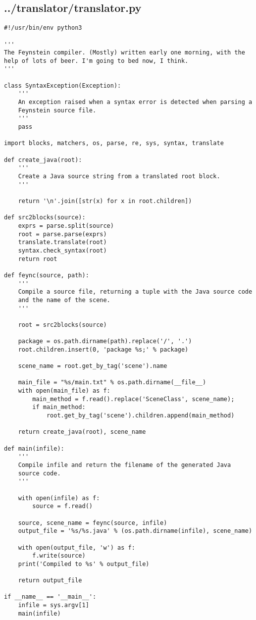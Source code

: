 \subsection*{../translator/translator.py}
\begin{lstlisting}
#!/usr/bin/env python3

'''
The Feynstein compiler. (Mostly) written early one morning, with the
help of lots of beer. I'm going to bed now, I think.
'''

class SyntaxException(Exception): 
    '''
    An exception raised when a syntax error is detected when parsing a
    Feynstein source file.
    '''
    pass

import blocks, matchers, os, parse, re, sys, syntax, translate

def create_java(root):
    '''
    Create a Java source string from a translated root block.
    '''

    return '\n'.join([str(x) for x in root.children])

def src2blocks(source):
    exprs = parse.split(source)
    root = parse.parse(exprs)
    translate.translate(root)
    syntax.check_syntax(root)
    return root

def feync(source, path):
    '''
    Compile a source file, returning a tuple with the Java source code
    and the name of the scene.
    '''

    root = src2blocks(source)

    package = os.path.dirname(path).replace('/', '.')
    root.children.insert(0, 'package %s;' % package)

    scene_name = root.get_by_tag('scene').name

    main_file = "%s/main.txt" % os.path.dirname(__file__)
    with open(main_file) as f:
        main_method = f.read().replace('SceneClass', scene_name);
        if main_method:
            root.get_by_tag('scene').children.append(main_method)

    return create_java(root), scene_name

def main(infile):
    '''
    Compile infile and return the filename of the generated Java
    source code.
    '''

    with open(infile) as f:
        source = f.read()

    source, scene_name = feync(source, infile)
    output_file = '%s/%s.java' % (os.path.dirname(infile), scene_name)

    with open(output_file, 'w') as f:
        f.write(source)
    print('Compiled to %s' % output_file)
    
    return output_file

if __name__ == '__main__':
    infile = sys.argv[1]
    main(infile)
\end{lstlisting}

